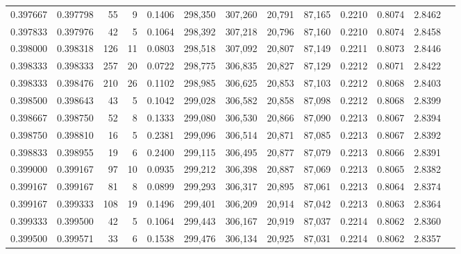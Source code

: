 \begin{tabular}{rrrrrrrrrrrrr}
0.397667 & 0.397798 &    55 &   9 &                                     0.1406 & 298,350 & 307,260 &  20,791 &  87,165 & 0.2210 & 0.8074 & 2.8462 \\
0.397833 & 0.397976 &    42 &   5 &                                     0.1064 & 298,392 & 307,218 &  20,796 &  87,160 & 0.2210 & 0.8074 & 2.8458 \\
0.398000 & 0.398318 &   126 &  11 &                                     0.0803 & 298,518 & 307,092 &  20,807 &  87,149 & 0.2211 & 0.8073 & 2.8446 \\
0.398333 & 0.398333 &   257 &  20 &                                     0.0722 & 298,775 & 306,835 &  20,827 &  87,129 & 0.2212 & 0.8071 & 2.8422 \\
0.398333 & 0.398476 &   210 &  26 &                                     0.1102 & 298,985 & 306,625 &  20,853 &  87,103 & 0.2212 & 0.8068 & 2.8403 \\
0.398500 & 0.398643 &    43 &   5 &                                     0.1042 & 299,028 & 306,582 &  20,858 &  87,098 & 0.2212 & 0.8068 & 2.8399 \\
0.398667 & 0.398750 &    52 &   8 &                                     0.1333 & 299,080 & 306,530 &  20,866 &  87,090 & 0.2213 & 0.8067 & 2.8394 \\
0.398750 & 0.398810 &    16 &   5 &                                     0.2381 & 299,096 & 306,514 &  20,871 &  87,085 & 0.2213 & 0.8067 & 2.8392 \\
0.398833 & 0.398955 &    19 &   6 &                                     0.2400 & 299,115 & 306,495 &  20,877 &  87,079 & 0.2213 & 0.8066 & 2.8391 \\
0.399000 & 0.399167 &    97 &  10 &                                     0.0935 & 299,212 & 306,398 &  20,887 &  87,069 & 0.2213 & 0.8065 & 2.8382 \\
0.399167 & 0.399167 &    81 &   8 &                                     0.0899 & 299,293 & 306,317 &  20,895 &  87,061 & 0.2213 & 0.8064 & 2.8374 \\
0.399167 & 0.399333 &   108 &  19 &                                     0.1496 & 299,401 & 306,209 &  20,914 &  87,042 & 0.2213 & 0.8063 & 2.8364 \\
0.399333 & 0.399500 &    42 &   5 &                                     0.1064 & 299,443 & 306,167 &  20,919 &  87,037 & 0.2214 & 0.8062 & 2.8360 \\
0.399500 & 0.399571 &    33 &   6 &                                     0.1538 & 299,476 & 306,134 &  20,925 &  87,031 & 0.2214 & 0.8062 & 2.8357 \\

\end{tabular}
